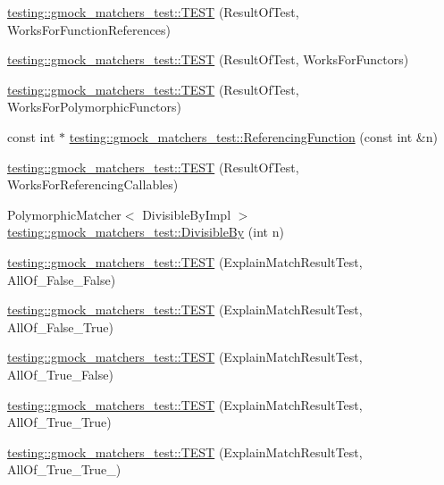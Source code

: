 \begin{DoxyCompactItemize}
\item 
\hyperlink{namespacetesting_1_1gmock__matchers__test_a1638ee6460100cbe21c65b6cdc06579a}{testing\+::gmock\+\_\+matchers\+\_\+test\+::\+T\+E\+ST} (Result\+Of\+Test, Works\+For\+Function\+References)
\item 
\hyperlink{namespacetesting_1_1gmock__matchers__test_a19b7a39915f7ad5a0b741caf7ae4e619}{testing\+::gmock\+\_\+matchers\+\_\+test\+::\+T\+E\+ST} (Result\+Of\+Test, Works\+For\+Functors)
\item 
\hyperlink{namespacetesting_1_1gmock__matchers__test_a976290e53e319b06c51a94f7e450d765}{testing\+::gmock\+\_\+matchers\+\_\+test\+::\+T\+E\+ST} (Result\+Of\+Test, Works\+For\+Polymorphic\+Functors)
\item 
const int $\ast$ \hyperlink{namespacetesting_1_1gmock__matchers__test_af3164fc302e0b727c1eb745bdeb959f6}{testing\+::gmock\+\_\+matchers\+\_\+test\+::\+Referencing\+Function} (const int \&n)
\item 
\hyperlink{namespacetesting_1_1gmock__matchers__test_a00ee08657c9e9e0c306be7b84cd2848c}{testing\+::gmock\+\_\+matchers\+\_\+test\+::\+T\+E\+ST} (Result\+Of\+Test, Works\+For\+Referencing\+Callables)
\item 
Polymorphic\+Matcher$<$ Divisible\+By\+Impl $>$ \hyperlink{namespacetesting_1_1gmock__matchers__test_ac5b1fd3b6a8141c7e83ef6040ed4630f}{testing\+::gmock\+\_\+matchers\+\_\+test\+::\+Divisible\+By} (int n)
\item 
\hyperlink{namespacetesting_1_1gmock__matchers__test_aa9a60a406d9f495de8c8552abf577dd1}{testing\+::gmock\+\_\+matchers\+\_\+test\+::\+T\+E\+ST} (Explain\+Match\+Result\+Test, All\+Of\+\_\+\+False\+\_\+\+False)
\item 
\hyperlink{namespacetesting_1_1gmock__matchers__test_a099aebb5417d5bd85e11aefe935ec345}{testing\+::gmock\+\_\+matchers\+\_\+test\+::\+T\+E\+ST} (Explain\+Match\+Result\+Test, All\+Of\+\_\+\+False\+\_\+\+True)
\item 
\hyperlink{namespacetesting_1_1gmock__matchers__test_a5d386691eaed59994a1d2b65f94b23a9}{testing\+::gmock\+\_\+matchers\+\_\+test\+::\+T\+E\+ST} (Explain\+Match\+Result\+Test, All\+Of\+\_\+\+True\+\_\+\+False)
\item 
\hyperlink{namespacetesting_1_1gmock__matchers__test_a16545b298640b253502d604f52ea95e2}{testing\+::gmock\+\_\+matchers\+\_\+test\+::\+T\+E\+ST} (Explain\+Match\+Result\+Test, All\+Of\+\_\+\+True\+\_\+\+True)
\item 
\hyperlink{namespacetesting_1_1gmock__matchers__test_af1ba4010a24716a51a302f9a518023b5}{testing\+::gmock\+\_\+matchers\+\_\+test\+::\+T\+E\+ST} (Explain\+Match\+Result\+Test, All\+Of\+\_\+\+True\+\_\+\+True\+\_)

\end{DoxyCompactItemize}
